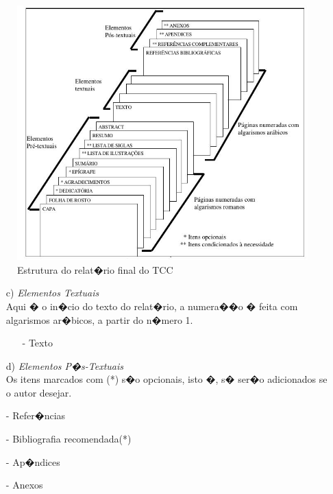 \documentclass[pnumromarab, normaltoc, a4paper, 12pt]{abnt}
\begin{document}
\newpage

\begin{figure}[!h]
  \begin{center}
  \caption{Estrutura do relat�rio final do TCC}
  \includegraphics[width=160mm]{images/imagem2.jpeg}
  \end{center}
\end{figure}

\begin{itemize}
  \leading{5mm}
  \item [c)] \emph{Elementos Textuais} \\
  Aqui � o in�cio do texto do relat�rio, a numera��o � feita com algarismos
  ar�bicos, a partir do n�mero 1.

  \begin{itemize}
    \item [-] Texto
  \end{itemize}

  \item [d)] \emph{Elementos P�s-Textuais} \\
  Os itens marcados com (*) s�o opcionais, isto �, s� ser�o adicionados se o
  autor desejar.
  \item [-] Refer�ncias
  \item [-] Bibliografia recomendada(*)
  \item [-] Ap�ndices
  \item [-] Anexos
\end{itemize}
\end{document}

